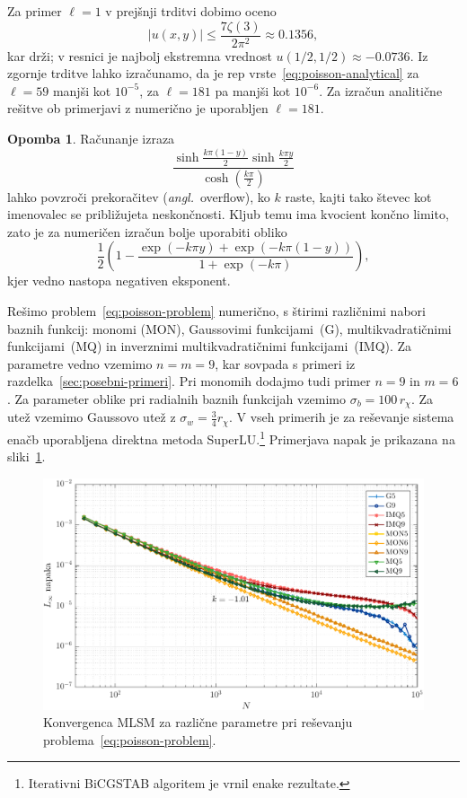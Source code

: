 \documentclass[12pt,a4paper,twoside]{article}
\theoremstyle{definition} %
\newtheorem{opomba}[definicija]{Opomba}
\theoremstyle{plain} %
\numberwithin{equation}{section}
\newcommand{\ang}[1]{(\hspace{-1.5px}\textit{angl.}\ #1)}
\newlength{\iw}
\begin{document}
Za primer $\ell = 1$  v prejšnji trditvi dobimo oceno
\begin{equation}
   |u(x, y)| \leq \frac{7 \zeta(3)}{2 \pi^2} \approx 0.1356,
\end{equation}
kar drži; v resnici je najbolj ekstremna vrednost $u(1/2, 1/2) \approx -0.0736$.
Iz zgornje trditve lahko izračunamo, da je rep
vrste~\eqref{eq:poisson-analytical} za $\ell = 59$ manjši kot $10^{-5}$, za
$\ell = 181$ pa manjši kot $10^{-6}$. Za izračun analitične rešitve ob
primerjavi z numerično je uporabljen $\ell = 181$.
\begin{opomba}
  Računanje izraza
  \begin{equation}
   \frac{\sinh \frac{k \pi  (1-y)}{2} \sinh \frac{k \pi y}{2}}{\cosh(\frac{k\pi}{2})}
  \end{equation}
  lahko povzroči prekoračitev \ang{overflow}, ko $k$ raste, kajti tako števec kot imenovalec se
  približujeta neskončnosti. Kljub temu ima kvocient končno limito, zato je za numeričen izračun
  bolje uporabiti obliko
  \begin{equation}
    \frac12\left( 1 - \frac{\exp(-k\pi y) + \exp(-k\pi(1-y)) }{1 + \exp(-k\pi)}\right),
  \end{equation}
  kjer vedno nastopa negativen eksponent.
\end{opomba}

Rešimo problem~\eqref{eq:poisson-problem} numerično, s štirimi različnimi nabori baznih funkcij:
monomi (MON), Gaussovimi funkcijami~(G), multikvadratičnimi funkcijami~(MQ) in inverznimi
multikvadratičnimi funkcijami~(IMQ).  Za parametre vedno vzemimo $n = m = 9$, kar sovpada s primeri
iz razdelka~\ref{sec:posebni-primeri}. Pri monomih dodajmo tudi primer $n = 9$ in $m = 6$. Za
parameter oblike pri radialnih baznih funkcijah vzemimo $\sigma_b = 100\, r_\chi$. Za utež vzemimo
Gaussovo utež z $\sigma_w = \frac34 r_\chi$. V vseh primerih je za reševanje sistema enačb
uporabljena direktna metoda SuperLU.\footnote{Iterativni BiCGSTAB algoritem je vrnil enake
rezultate.} Primerjava napak je prikazana na sliki~\ref{fig:poisson-square-convergence}.

\begin{figure}[h]
  \centering
  \includegraphics[width=\iw]{images/poisson_square_convergence.pdf}
  \caption[Konvergenca MLSM pri reševanju Poissonove enačbe.]{Konvergenca MLSM
  za različne parametre pri reševanju problema~\eqref{eq:poisson-problem}.}
  \label{fig:poisson-square-convergence}
\end{figure}
\end{document}

